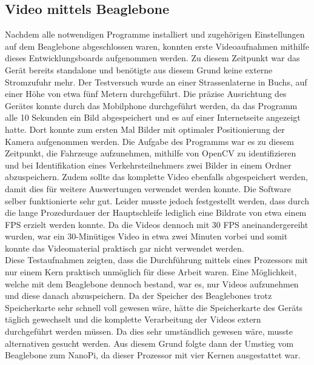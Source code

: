 \subsection{Video mittels Beaglebone}
Nachdem alle notwendigen Programme installiert und zugehörigen Einstellungen auf dem Beaglebone abgeschlossen waren, konnten erste Videoaufnahmen mithilfe dieses Entwicklungsboards aufgenommen werden. Zu diesem Zeitpunkt war das Gerät bereits standalone und benötigte aus diesem Grund keine externe Stromzufuhr mehr. Der Testversuch wurde an einer Strassenlaterne in Buchs, auf einer Höhe von etwa fünf Metern durchgeführt. Die präzise Ausrichtung des Gerätes konnte durch das Mobilphone durchgeführt werden, da das Programm alle 10 Sekunden ein Bild abgespeichert und es auf einer Internetseite angezeigt hatte. Dort konnte zum ersten Mal Bilder mit optimaler Positionierung der Kamera aufgenommen werden. Die Aufgabe des Programms war es zu diesem Zeitpunkt, die Fahrzeuge aufzunehmen, mithilfe von OpenCV zu identifizieren und bei Identifikation eines Verkehrsteilnehmers zwei Bilder in einem Ordner abzuspeichern. Zudem sollte das komplette Video ebenfalls abgespeichert werden, damit dies für weitere Auswertungen verwendet werden konnte. Die Software selber funktionierte sehr gut. Leider musste jedoch festgestellt werden, dass durch die lange Prozedurdauer der Hauptschleife lediglich eine Bildrate von etwa einem FPS erzielt werden konnte. Da die Videos dennoch mit 30 FPS aneinandergereiht wurden, war ein 30-Minütiges Video in etwa zwei Minuten vorbei und somit konnte das Videomaterial praktisch gar nicht verwendet werden.\\
Diese Testaufnahmen zeigten, dass die Durchführung mittels eines Prozessors mit nur einem Kern praktisch unmöglich für diese Arbeit waren. Eine Möglichkeit, welche mit dem Beaglebone dennoch bestand, war es, nur Videos aufzunehmen und diese danach abzuspeichern. Da der Speicher des Beaglebones trotz Speicherkarte sehr schnell voll gewesen wäre, hätte die Speicherkarte des Geräts täglich gewechselt und die komplette Verarbeitung der Videos extern durchgeführt werden müssen. Da dies sehr umständlich gewesen wäre, musste alternativen gesucht werden. Aus diesem Grund folgte dann der Umstieg vom Beaglebone zum NanoPi, da dieser Prozessor mit vier Kernen ausgestattet war.